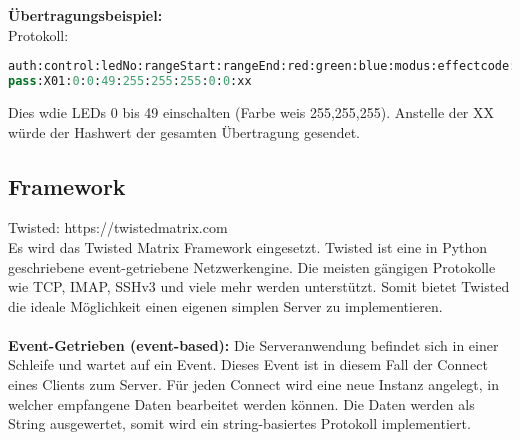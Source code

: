 \textbf{Übertragungsbeispiel:}\\
		Protokoll: 	
\begin{lstlisting}[caption = Beispielübertragung des Protokolls, language=python, frame=single, breaklines=true,columns=fullflexible, commentstyle=\color{gray}\upshape, captionpos=b]
auth:control:ledNo:rangeStart:rangeEnd:red:green:blue:modus:effectcode:hash
pass:X01:0:0:49:255:255:255:0:0:xx
\end{lstlisting}
Dies w die LEDs 0 bis 49 einschalten (Farbe weis 255,255,255). Anstelle der XX würde der Hashwert der gesamten Übertragung gesendet. 
\subsection{Framework}
Twisted: https://twistedmatrix.com \\
Es wird das Twisted Matrix Framework eingesetzt. Twisted ist eine in Python geschriebene  event-getriebene Netzwerkengine. Die meisten gängigen Protokolle wie TCP, IMAP, SSHv3 und viele mehr werden unterstützt. Somit bietet Twisted die ideale Möglichkeit einen eigenen simplen Server zu implementieren. \\\\
\textbf{Event-Getrieben (event-based):} Die Serveranwendung befindet sich in einer Schleife und wartet auf ein Event. Dieses Event ist in diesem Fall der Connect eines Clients zum Server. Für jeden Connect wird eine neue Instanz angelegt, in welcher empfangene Daten bearbeitet werden können. Die Daten werden als String ausgewertet, somit wird ein string-basiertes Protokoll implementiert. \cite{eventbased}

